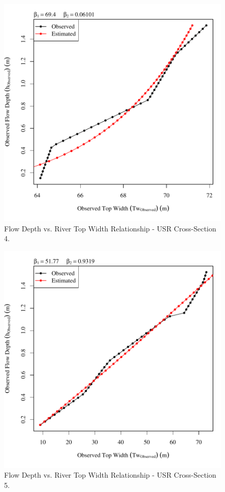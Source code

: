 \begin{center}
\begin{figure}[htbp]
	\includegraphics[width=6in]{"Figures/Results_USR/Survey Tw vs H-Section 4"}
	\caption{Flow Depth vs. River Top Width Relationship - USR Cross-Section 4.}
\end{figure}
\end{center}
\newpage

\begin{center}
\begin{figure}[htbp]
	\includegraphics[width=6in]{"Figures/Results_USR/Survey Tw vs H-Section 5"}
	\caption{Flow Depth vs. River Top Width Relationship - USR Cross-Section 5.}
\end{figure}
\end{center}
\newpage

